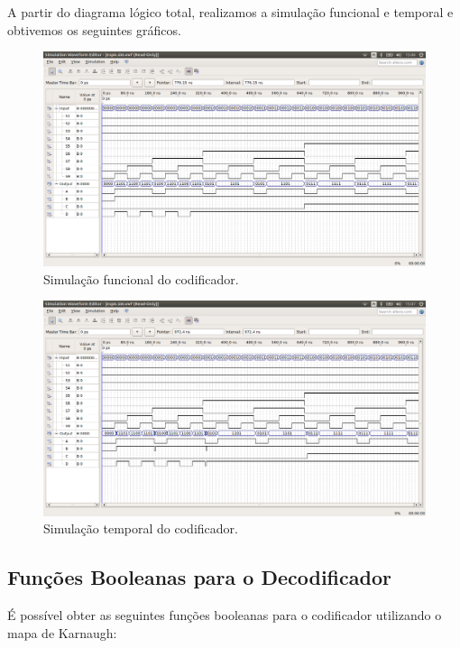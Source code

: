 \documentclass[12pt]{article}
\begin{document}
A partir do diagrama lógico total, realizamos a simulação funcional e temporal e obtivemos os seguintes gráficos.

\begin{figure}[H]
	\centering
	\includegraphics[width=1\textwidth]{functionalcoder.png}
	\caption{Simulação funcional do codificador.}
	\label{fig:funccoder}
\end{figure}

\begin{figure}[H]
	\centering
	\includegraphics[width=1\textwidth]{timingcoder.png}
	\caption{Simulação temporal do codificador.}
	\label{fig:timecoder}
\end{figure}


\subsection{Funções Booleanas para o Decodificador}
\label{sec:Decod}

É possível obter as seguintes funções booleanas para o codificador utilizando o mapa de Karnaugh:
\end{document}
